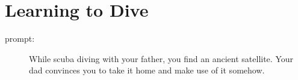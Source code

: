 \section*{Learning to Dive}

\begin{description}
\item[prompt:] While scuba diving with your father, you find an ancient satellite. Your dad convinces you to take it home and make use of it somehow.
\end{description}

